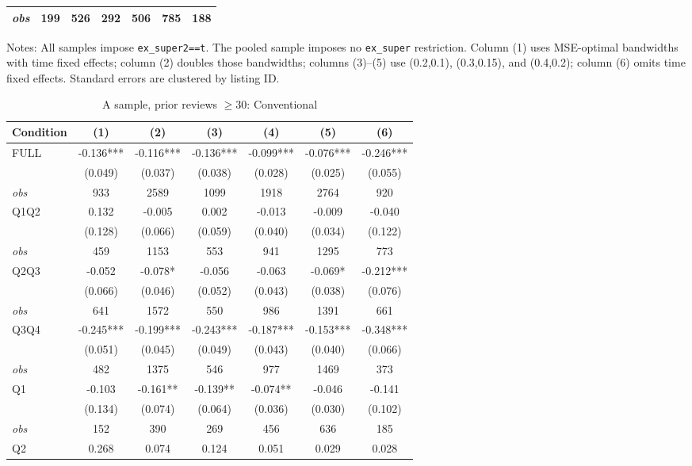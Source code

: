 \begin{table}[!htbp]
\begin{tabular}{lcccccc}
\textit{obs} & 199 & 526 & 292 & 506 & 785 & 188 \\
\bottomrule
\end{tabular}
\begin{minipage}{0.98\textwidth}\footnotesize
Notes: All samples impose \texttt{ex\_super2==t}. The pooled sample imposes no \texttt{ex\_super} restriction. Column (1) uses MSE-optimal bandwidths with time fixed effects; column (2) doubles those bandwidths; columns (3)--(5) use (0.2,0.1), (0.3,0.15), and (0.4,0.2); column (6) omits time fixed effects. Standard errors are clustered by listing ID.
\end{minipage}
\end{table}

\begin{table}[!htbp]
\centering
\caption{A sample, prior reviews $\geq30$: Conventional}
\begin{tabular}{lcccccc}
\toprule
Condition & (1) & (2) & (3) & (4) & (5) & (6) \\
\midrule
FULL & -0.136*** & -0.116*** & -0.136*** & -0.099*** & -0.076*** & -0.246*** \\
 & (0.049) & (0.037) & (0.038) & (0.028) & (0.025) & (0.055) \\
\textit{obs} & 933 & 2589 & 1099 & 1918 & 2764 & 920 \\
Q1Q2 & 0.132 & -0.005 & 0.002 & -0.013 & -0.009 & -0.040 \\
 & (0.128) & (0.066) & (0.059) & (0.040) & (0.034) & (0.122) \\
\textit{obs} & 459 & 1153 & 553 & 941 & 1295 & 773 \\
Q2Q3 & -0.052 & -0.078* & -0.056 & -0.063 & -0.069* & -0.212*** \\
 & (0.066) & (0.046) & (0.052) & (0.043) & (0.038) & (0.076) \\
\textit{obs} & 641 & 1572 & 550 & 986 & 1391 & 661 \\
Q3Q4 & -0.245*** & -0.199*** & -0.243*** & -0.187*** & -0.153*** & -0.348*** \\
 & (0.051) & (0.045) & (0.049) & (0.043) & (0.040) & (0.066) \\
\textit{obs} & 482 & 1375 & 546 & 977 & 1469 & 373 \\
Q1 & -0.103 & -0.161** & -0.139** & -0.074** & -0.046 & -0.141 \\
 & (0.134) & (0.074) & (0.064) & (0.036) & (0.030) & (0.102) \\
\textit{obs} & 152 & 390 & 269 & 456 & 636 & 185 \\
Q2 & 0.268 & 0.074 & 0.124 & 0.051 & 0.029 & 0.028 \\

\end{tabular}
\end{table}
